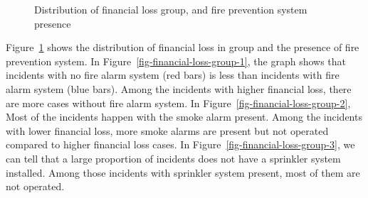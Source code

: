 \documentclass[
  letterpaper,
  DIV=11,
  numbers=noendperiod]{scrartcl}
\begin{document}
\begin{figure}
\begin{minipage}{0.50\linewidth}
\end{minipage}%
\newline
\begin{minipage}{0.50\linewidth}



\end{minipage}%

\caption{\label{fig-financial-loss-group}Distribution of financial loss
group, and fire prevention system presence}

\end{figure}%

Figure~\ref{fig-financial-loss-group} shows the distribution of
financial loss in group and the presence of fire prevention system. In
Figure~\ref{fig-financial-loss-group-1}, the graph shows that incidents
with no fire alarm system (red bars) is less than incidents with fire
alarm system (blue bars). Among the incidents with higher financial
loss, there are more cases without fire alarm system. In
Figure~\ref{fig-financial-loss-group-2}, Most of the incidents happen
with the smoke alarm present. Among the incidents with lower financial
loss, more smoke alarms are present but not operated compared to higher
financial loss cases. In Figure~\ref{fig-financial-loss-group-3}, we can
tell that a large proportion of incidents does not have a sprinkler
system installed. Among those incidents with sprinkler system present,
most of them are not operated.
\end{document}
